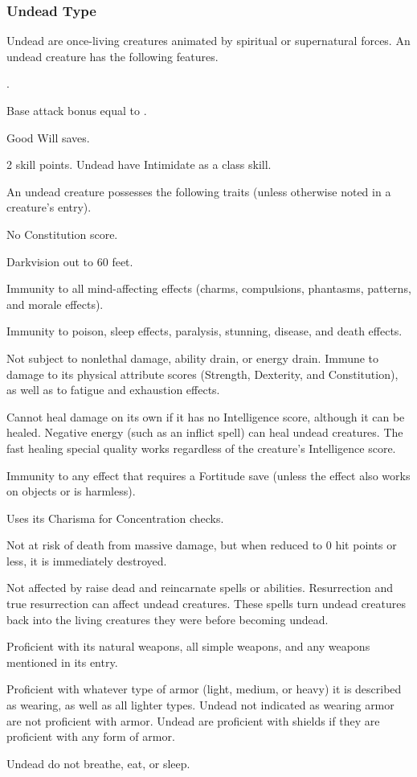 \subsubsection{Undead Type} Undead are once-living creatures animated by spiritual or supernatural forces.
 An undead creature has the following features.
\begin{itemize*}
\item {}.
\item Base attack bonus equal to .
\item Good Will saves.
\item 2 skill points. Undead have Intimidate as a class skill.
\end{itemize*}
 An undead creature possesses the following traits (unless otherwise noted in a creature's entry).
\begin{itemize*}
\item No Constitution score.
\item Darkvision out to 60 feet.
\item Immunity to all mind-affecting effects (charms, compulsions, phantasms, patterns, and morale effects).
\item Immunity to poison, sleep effects, paralysis, stunning, disease, and death effects.
\item Not subject to nonlethal damage, ability drain, or energy drain. Immune to damage to its physical attribute scores (Strength, Dexterity, and Constitution), as well as to fatigue and exhaustion effects.
\item Cannot heal damage on its own if it has no Intelligence score, although it can be healed. Negative energy (such as an inflict spell) can heal undead creatures. The fast healing special quality works regardless of the creature's Intelligence score.
\item Immunity to any effect that requires a Fortitude save (unless the effect also works on objects or is harmless).
\item Uses its Charisma for Concentration checks.
\item Not at risk of death from massive damage, but when reduced to 0 hit points or less, it is immediately destroyed.
\item Not affected by raise dead and reincarnate spells or abilities. Resurrection and true resurrection can affect undead creatures. These spells turn undead creatures back into the living creatures they were before becoming undead.
\item Proficient with its natural weapons, all simple weapons, and any weapons mentioned in its entry.
\item Proficient with whatever type of armor (light, medium, or heavy) it is described as wearing, as well as all lighter types. Undead not indicated as wearing armor are not proficient with armor. Undead are proficient with shields if they are proficient with any form of armor.
\item Undead do not breathe, eat, or sleep.
\end{itemize*}

